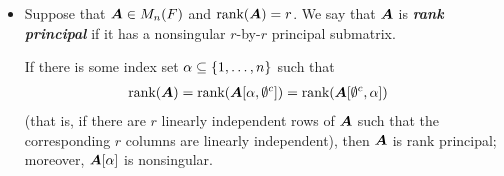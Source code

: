 \documentclass[11pt]{article}
\begin{document}
\begin{itemize}
\item Suppose that $\boldsymbol{A} \in M_{n}(F)$ and $\text{rank}(\boldsymbol{A}) = r$. We say that $\boldsymbol{A}$ is \emph{\textbf{rank principal}} if it has a nonsingular $r$-by-$r$ principal submatrix. 

If there is some index set $\alpha \subseteq \left\{1,\ldots,n\right\}$ such that
\begin{align}
\text{rank}(\boldsymbol{A}) &= \text{rank}(\boldsymbol{A}[\alpha, \emptyset^{c}]) =  \text{rank}(\boldsymbol{A}[ \emptyset^{c}, \alpha]) \label{eqn: rank_principal}
\end{align} (that is, if there are $r$ linearly independent rows of $\boldsymbol{A}$ such that the corresponding $r$ columns are linearly independent), then $\boldsymbol{A}$ is rank principal; moreover, $\boldsymbol{A}[\alpha]$ is nonsingular.
\end{itemize}
\end{document}
